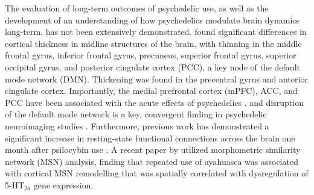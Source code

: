 The evaluation of long-term outcomes of psychedelic use, as well as the
development of an understanding of how psychedelics modulate brain
dynamics long-term, has not been extensively demonstrated. \textcite{Bouso2015} found significant differences in cortical thickness in midline
structures of the brain, with thinning in the middle frontal gyrus,
inferior frontal gyrus, precuneus, superior frontal gyrus, superior
occipital gyrus, and posterior cingulate cortex (PCC), a key node of the
default mode network (DMN). Thickening was found in
the precentral gyrus and anterior cingulate cortex. Importantly, the
medial prefrontal cortex (mPFC), ACC, and PCC have been associated with
the acute effects of psychedelics \parencite{Riba2006}, and disruption of
the default mode network is a key, convergent finding in psychedelic
neuroimaging studies \parencite{Carhart-Harris2017a,McCulloch2022}. Furthermore, previous work has demonstrated a significant
increase in resting-state functional connections across the brain one
month after psilocybin use \parencite{Barrett2020}. A recent paper by \textcite{Mallaroni2023} utilized morphometric similarity network (MSN) analysis, finding that repeated use of ayahuasca was associated with cortical MSN remodelling that was spatially
correlated with dysregulation of 5-HT$_{2a}$ gene expression.

